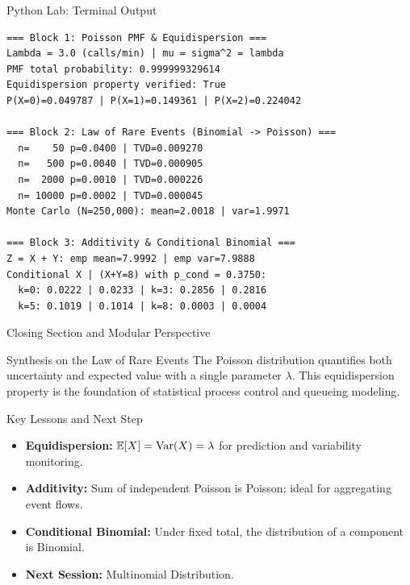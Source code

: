 \documentclass[aspectratio=169,xcolor={dvipsnames,table}]{beamer}
\begin{document}
\begin{frame}[fragile]{Python Lab: Terminal Output}
	\vspace{-0.1cm}
	\begin{block}{}
		\fontsize{4.5pt}{5.2pt}\selectfont
		\begin{verbatim}
=== Block 1: Poisson PMF & Equidispersion ===
Lambda = 3.0 (calls/min) | mu = sigma^2 = lambda
PMF total probability: 0.999999329614
Equidispersion property verified: True
P(X=0)=0.049787 | P(X=1)=0.149361 | P(X=2)=0.224042

=== Block 2: Law of Rare Events (Binomial -> Poisson) ===
  n=    50 p=0.0400 | TVD=0.009270
  n=   500 p=0.0040 | TVD=0.000905
  n=  2000 p=0.0010 | TVD=0.000226
  n= 10000 p=0.0002 | TVD=0.000045
Monte Carlo (N=250,000): mean=2.0018 | var=1.9971

=== Block 3: Additivity & Conditional Binomial ===
Z = X + Y: emp mean=7.9992 | emp var=7.9888
Conditional X | (X+Y=8) with p_cond = 0.3750:
  k=0: 0.0222 | 0.0233 | k=3: 0.2856 | 0.2816
  k=5: 0.1019 | 0.1014 | k=8: 0.0003 | 0.0004
		\end{verbatim}
	\end{block}
\end{frame}

\begin{frame}{Closing Section and Modular Perspective}
	\vspace{-0.15cm}
	\begin{block}{Synthesis on the Law of Rare Events}
		\scriptsize
		The Poisson distribution quantifies both uncertainty and expected value with a single parameter $\lambda$. This equidispersion property is the foundation of statistical process control and queueing modeling.
	\end{block}
	\vspace{0.02cm}
	\pause
	\begin{alertblock}{Key Lessons and Next Step}
		\begin{itemize}\itemsep=0.04cm
			\item \textbf{Equidispersion:} $\mathbb{E}[X] = \operatorname{Var}(X) = \lambda$ for prediction and variability monitoring.
			\item \textbf{Additivity:} Sum of independent Poisson is Poisson; ideal for aggregating event flows.
			\item \textbf{Conditional Binomial:} Under fixed total, the distribution of a component is Binomial.
			\item \textbf{Next Session:} \textcolor{TecRojo}{Multinomial Distribution}.
		\end{itemize}
	\end{alertblock}
\end{frame}
\end{document}

